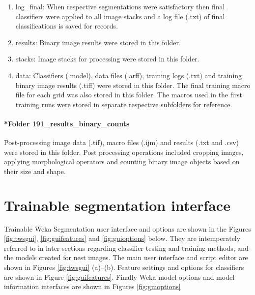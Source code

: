 \begin{enumerate}
\item log\_final: When respective segmentations were satisfactory then final classifiers were applied to all image stacks and a log file (.txt) of final classifications is saved for records.
\item results: Binary image results were stored in this folder.
\item stacks: Image stacks for processing were stored in this folder.
\item data: Classifiers (.model), data files (.arff), training logs (.txt) and training binary image results (.tiff) were stored in this folder. The final training macro file for each grid was also stored in this folder. The macros used in the first training runs were stored in separate respective subfolders for reference.
\end{enumerate}

\paragraph{*Folder 191\_results\_binary\_counts} Post-processing image data (.tif), macro files (.ijm) and results (.txt and .csv) were stored in this folder. Post processing operations included cropping images, applying morphological operators and counting binary image objects based on their size and shape.

\section{Trainable segmentation interface}\label{sec:segmentation-interface}
Trainable Weka Segmentation user interface and options are shown in the Figures \ref{fig:twsgui}, \ref{fig:guifeatures} and \ref{fig:guioptions} below. They are intemperately referred to in later sections regarding  classifier testing and training methods, and the models created for nest images. The main user interface and script editor are shown in Figures \ref{fig:twsgui} (a)--(b). Feature settings and options for classifiers are shown in Figure \ref{fig:guifeatures}. Finally \ac{Weka} model options and model information interfaces are shown in Figures \ref{fig:guioptions}

